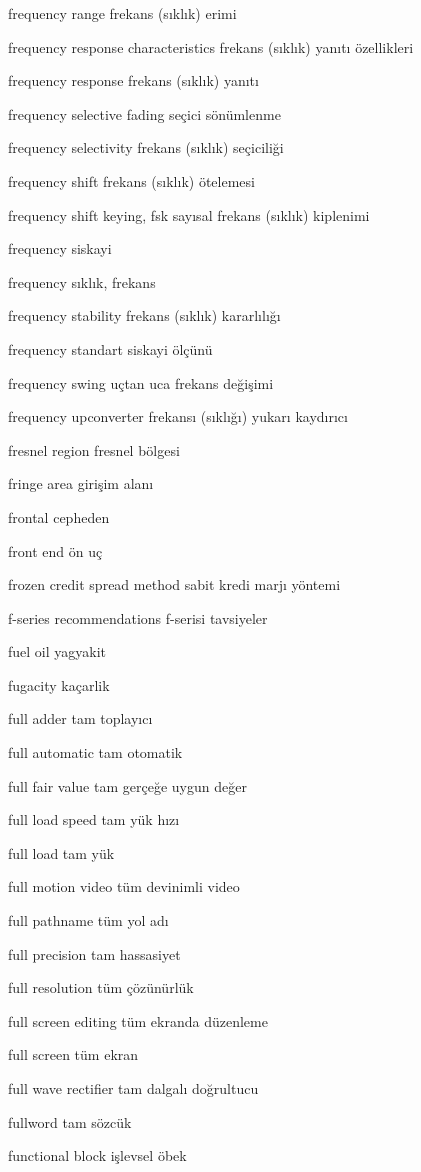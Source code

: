 \documentclass[12pt,fleqn]{article}\usepackage{../../common}
\begin{document}
frequency range frekans (sıklık) erimi

frequency response characteristics frekans (sıklık) yanıtı özellikleri

frequency response frekans (sıklık) yanıtı

frequency selective fading seçici sönümlenme

frequency selectivity frekans (sıklık) seçiciliği

frequency shift frekans (sıklık) ötelemesi

frequency shift keying, fsk sayısal frekans (sıklık) kiplenimi

frequency siskayi

frequency sıklık, frekans

frequency stability frekans (sıklık) kararlılığı

frequency standart siskayi ölçünü

frequency swing uçtan uca frekans değişimi

frequency upconverter frekansı (sıklığı) yukarı kaydırıcı

fresnel region fresnel bölgesi

fringe area girişim alanı

frontal cepheden

front end ön uç

frozen credit spread method sabit kredi marjı yöntemi

f-series recommendations f-serisi tavsiyeler

fuel oil yagyakit

fugacity kaçarlik

full adder tam toplayıcı

full automatic tam otomatik

full fair value tam gerçeğe uygun değer

full load speed tam yük hızı

full load tam yük

full motion video tüm devinimli video

full pathname tüm yol adı

full precision tam hassasiyet

full resolution tüm çözünürlük

full screen editing tüm ekranda düzenleme

full screen tüm ekran

full wave rectifier tam dalgalı doğrultucu

fullword tam sözcük

functional block işlevsel öbek
\end{document}
